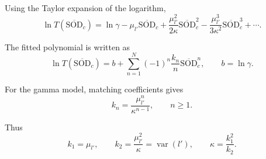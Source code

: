 Using the Taylor expansion of the logarithm,
\begin{equation}
\ln T(\overline{\mathrm{SOD}}_c)
=
\ln\gamma
-
\mu_{l'}\overline{\mathrm{SOD}}_c
+
\frac{\mu_{l'}^2}{2\kappa}\overline{\mathrm{SOD}}_c^2
-
\frac{\mu_{l'}^3}{3\kappa^2}\overline{\mathrm{SOD}}_c^3
+
\cdots .
\label{eq:log_gamma_taylor}
\end{equation}



The fitted polynomial is written as
\begin{equation}
\ln T(\overline{\mathrm{SOD}}_c)
=
b
+
\sum_{n=1}^{N}
(-1)^n
\frac{k_n}{n}
\overline{\mathrm{SOD}}_c^n,
\qquad
b=\ln\gamma .
\label{eq:log_polynomial_fit_appendix}
\end{equation}



For the gamma model, matching coefficients gives
\begin{equation}
k_n
=
\frac{\mu_{l'}^{n}}{\kappa^{n-1}},
\qquad
n\ge 1 .
\label{eq:gamma_coefficient_identity}
\end{equation}




Thus
\begin{equation}
k_1=\mu_{l'},
\qquad
k_2=\frac{\mu_{l'}^{2}}{\kappa}
=
\operatorname{var}(l'),
\qquad
\kappa=\frac{k_1^2}{k_2}.
\label{eq:k1_k2_kappa_identity}
\end{equation}
